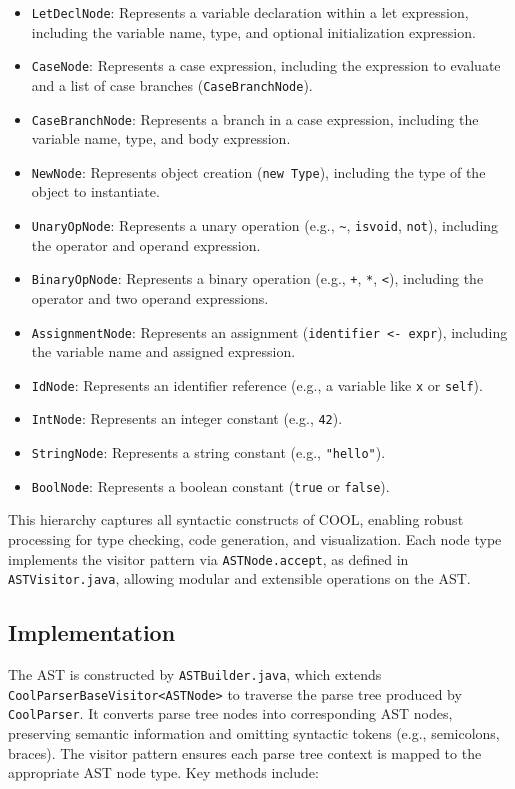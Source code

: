 \documentclass[11pt, titlepage]{article}
\begin{document}
\begin{itemize}[leftmargin=*]
\begin{itemize}[leftmargin=*]
            \item \texttt{LetDeclNode}: Represents a variable declaration within a let expression, including the variable name, type, and optional initialization expression.
            \item \texttt{CaseNode}: Represents a case expression, including the expression to evaluate and a list of case branches (\texttt{CaseBranchNode}).
            \item \texttt{CaseBranchNode}: Represents a branch in a case expression, including the variable name, type, and body expression.
            \item \texttt{NewNode}: Represents object creation (\texttt{new Type}), including the type of the object to instantiate.
            \item \texttt{UnaryOpNode}: Represents a unary operation (e.g., \texttt{\textasciitilde}, \texttt{isvoid}, \texttt{not}), including the operator and operand expression.
            \item \texttt{BinaryOpNode}: Represents a binary operation (e.g., \texttt{+}, \texttt{*}, \texttt{<}), including the operator and two operand expressions.
            \item \texttt{AssignmentNode}: Represents an assignment (\texttt{identifier <- expr}), including the variable name and assigned expression.
            \item \texttt{IdNode}: Represents an identifier reference (e.g., a variable like \texttt{x} or \texttt{self}).
            \item \texttt{IntNode}: Represents an integer constant (e.g., \texttt{42}).
            \item \texttt{StringNode}: Represents a string constant (e.g., \texttt{"hello"}).
            \item \texttt{BoolNode}: Represents a boolean constant (\texttt{true} or \texttt{false}).
        \end{itemize}
\end{itemize}

This hierarchy captures all syntactic constructs of COOL, enabling robust processing for type checking, code generation, and visualization. Each node type implements the visitor pattern via \texttt{ASTNode.accept}, as defined in \texttt{ASTVisitor.java}, allowing modular and extensible operations on the AST.

\subsection{Implementation}
The AST is constructed by \texttt{ASTBuilder.java}, which extends \texttt{CoolParserBaseVisitor<ASTNode>} to traverse the parse tree produced by \texttt{CoolParser}. It converts parse tree nodes into corresponding AST nodes, preserving semantic information and omitting syntactic tokens (e.g., semicolons, braces). The visitor pattern ensures each parse tree context is mapped to the appropriate AST node type. Key methods include:
\end{document}
